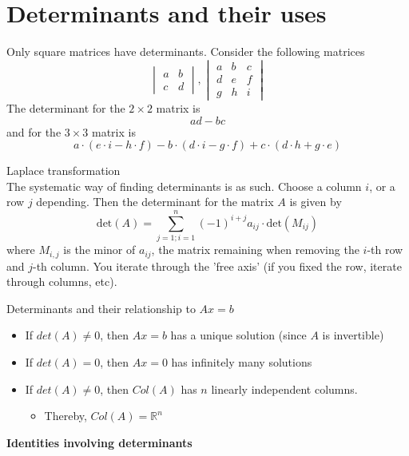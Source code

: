 \documentclass[journal, letterpaper]{IEEEtran}
\begin{document}
    \section{Determinants and their uses}
    Only square matrices have determinants. Consider the following matrices
    $$
        \begin{vmatrix}
            a & b \\ c & d
        \end{vmatrix},
        \begin{vmatrix}
            a & b & c \\ d & e & f \\ g & h & i
        \end{vmatrix}
    $$
    The determinant for the $2 \times 2$ matrix is
    $$ ad - bc$$
    and for the $3 \times 3$ matrix is
    $$ a \cdot (e\cdot i - h \cdot f) - b\cdot(d \cdot i - g \cdot f) + c \cdot (d \cdot h + g \cdot e)$$
    \begin{mybox}{Laplace transformation} \\ 
        The systematic way of finding determinants is as such. Choose a column $i$, or a row $j$ depending. Then the determinant 
        for the matrix $A$ is given by
        $$ \text{det}(A) = \sum_{j=1;i=1}^{n} (-1)^{i + j}a_{ij} \cdot \text{det}(M_{ij})$$
        where $M_{i, j}$ is the minor of $a_{ij}$, the matrix remaining when removing the $i$-th row and $j$-th column. You iterate through the 'free axis' (if you fixed the row, iterate through columns, etc).
    \end{mybox}
    \begin{myboxr}{Determinants and their relationship to $Ax = b$}
        \begin{itemize}
            \item If $det(A) \neq 0$, then $Ax = b$ has a unique solution (since $A$ is invertible)
            \item If $det(A) = 0$, then $Ax = 0$ has infinitely many solutions
            \item If $det(A) \neq 0$, then $Col(A)$ has $n$ linearly independent columns.
            \begin{itemize}
                \item Thereby, $Col(A) = \mathbb{R}^n$
            \end{itemize}
        \end{itemize}
    \end{myboxr}
    \textbf{Identities involving determinants}
\end{document}
